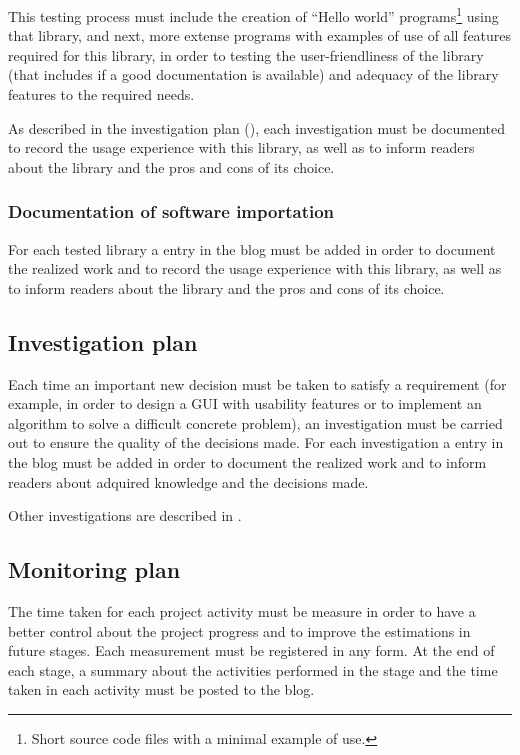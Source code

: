 \documentclass[twocolumn]{article}
\begin{document}
This testing process must include the creation of ``Hello
world'' programs\footnote{Short source code files with a minimal
  example of use.} using that library, and next, more extense programs
with examples of use of all features required for this library, in
order to testing the user-friendliness of the library (that includes if a
good documentation is available) and adequacy of the library features
to the required needs.

As described in the investigation plan
(), each investigation must be
documented to record the usage experience with this library, as well
as to inform readers about the library and the pros and cons of its
choice.

\subsubsection{Documentation of software importation}
\label{sssec:doc-importation-plan}
For each tested library a entry in the \fav blog must be added in
order to document the realized work and to record the usage
experience with this library, as well as to inform readers about the
library and the pros and cons of its choice.

\subsection{Investigation plan}
\label{ssec:investigation-plan}
Each time an important new decision must be taken to satisfy a
requirement (for example, in order to design a GUI with usability
features or to implement an algorithm to solve a difficult concrete
problem), an investigation must be carried out to ensure the quality
of the decisions made. For each investigation a entry in the \fav blog
must be added in order to document the realized work and to inform
readers about adquired knowledge and the decisions made.

Other investigations are described in
.

\subsection{Monitoring plan}
\label{ssec:monitoring-plan}
The time taken for each project activity must be measure in order to
have a better control about the project progress and to improve the
estimations in future stages. Each measurement must be registered in
any form. At the end of each stage, a summary about the activities
performed in the stage and the time taken in each activity must be
posted to the \favp blog.
\end{document}
